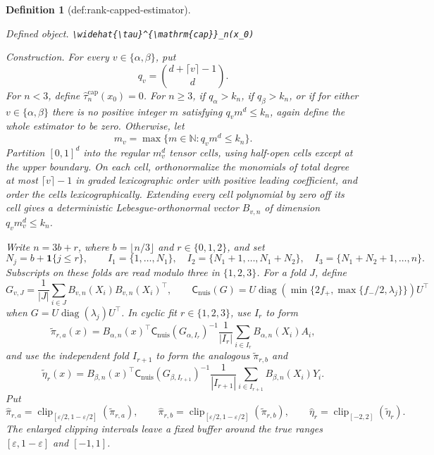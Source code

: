 \documentclass{article}
\newtheorem{definition}{Definition}
\begin{document}
\begin{definition}[def:rank-capped-estimator]\label{def:rank-capped-estimator}
\par\smallskip\noindent\emph{Defined object.} \texttt{\textbackslash{}\allowbreak{}widehat\{\textbackslash{}\allowbreak{}tau\}\allowbreak{}\textasciicircum{}\{\textbackslash{}\allowbreak{}mathrm\{cap\}\allowbreak{}\}\allowbreak{}\_\allowbreak{}n(x\_\allowbreak{}0)}
\par\smallskip\noindent\emph{Construction.} For every \(v\in\{\alpha,\beta\}\), put
\[
q_v=\binom{d+\lceil v\rceil-1}{d}.
\]
For \(n<3\), define \(\widehat\tau_n^{\mathrm{cap}}(x_0)=0\).  For
\(n\geq3\), if \(q_\alpha>k_n\), if \(q_\beta>k_n\), or if for either
\(v\in\{\alpha,\beta\}\) there is no positive integer \(m\) satisfying
\(q_vm^d\leq k_n\), again define the whole estimator to be zero.  Otherwise,
let
\[
m_v=\max\{m\in\mathbb N:q_vm^d\leq k_n\}.
\]
Partition \([0,1]^d\) into the regular \(m_v^d\) tensor cells, using
half-open cells except at the upper boundary.  On each cell, orthonormalize
the monomials of total degree at most \(\lceil v\rceil-1\) in graded
lexicographic order with positive leading coefficient, and order the cells
lexicographically.  Extending every cell polynomial by zero off its cell
gives a deterministic Lebesgue-orthonormal vector \(B_{v,n}\) of dimension
\(q_vm_v^d\leq k_n\).

Write \(n=3b+r\), where \(b=\lfloor n/3\rfloor\) and
\(r\in\{0,1,2\}\), and set
\[
N_j=b+\mathbf 1\{j\leq r\},\qquad
I_1=\{1,\ldots,N_1\},\quad
I_2=\{N_1+1,\ldots,N_1+N_2\},\quad
I_3=\{N_1+N_2+1,\ldots,n\}.
\]
Subscripts on these folds are read modulo three in \(\{1,2,3\}\).  For a
fold \(J\), define
\[
G_{v,J}=\frac1{|J|}\sum_{i\in J}B_{v,n}(X_i)B_{v,n}(X_i)^\top,
\qquad
\mathsf C_{\mathrm{nuis}}(G)
=U\operatorname{diag}\!\left(
\min\{2f_+,\max\{f_-/2,\lambda_j\}\}
\right)U^\top
\]
when \(G=U\operatorname{diag}(\lambda_j)U^\top\).  In cyclic fit
\(r\in\{1,2,3\}\), use \(I_r\) to form
\[
\widetilde\pi_{r,a}(x)=B_{\alpha,n}(x)^\top
\mathsf C_{\mathrm{nuis}}(G_{\alpha,I_r})^{-1}
\frac1{|I_r|}\sum_{i\in I_r}B_{\alpha,n}(X_i)A_i,
\]
and use the independent fold \(I_{r+1}\) to form the analogous
\(\widetilde\pi_{r,b}\) and
\[
\widetilde\eta_r(x)=B_{\beta,n}(x)^\top
\mathsf C_{\mathrm{nuis}}(G_{\beta,I_{r+1}})^{-1}
\frac1{|I_{r+1}|}\sum_{i\in I_{r+1}}B_{\beta,n}(X_i)Y_i.
\]
Put
\[
\widehat\pi_{r,a}=\operatorname{clip}_{[\varepsilon/2,1-\varepsilon/2]}
(\widetilde\pi_{r,a}),\qquad
\widehat\pi_{r,b}=\operatorname{clip}_{[\varepsilon/2,1-\varepsilon/2]}
(\widetilde\pi_{r,b}),\qquad
\widehat\eta_r=\operatorname{clip}_{[-2,2]}(\widetilde\eta_r).
\]
The enlarged clipping intervals leave a fixed buffer around the true ranges
\([\varepsilon,1-\varepsilon]\) and \([-1,1]\).


\end{definition}
\end{document}

